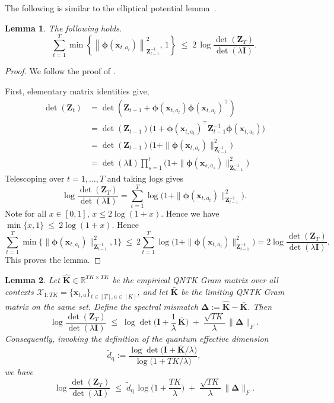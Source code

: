 \documentclass[pdflatex,sn-mathphys-num]{sn-jnl}%
\theoremstyle{thmstyleone}%
\theoremstyle{thmstyletwo}%
\theoremstyle{thmstylethree}%
\newtheorem{lemma}{Lemma}[section]
\newcommand{\norm}[1]{\left\lVert#1\right\rVert}
\newcommand{\xbf}{\mathbf{x}}
\newcommand{\Ibf}{\mathbf{I}}
\newcommand{\phibf}{\bm{\phi}}
\newcommand{\Zbf}{\mathbf{Z}}
\begin{document}
\begin{appendices}
The following is similar to  the elliptical potential lemma~\cite{linucb2011}.
\begin{lemma}
\label{lem:elliptical}
The following holds. 
\[
\sum_{t=1}^T \min\!\left\{ \norm{\phibf(\xbf_{t,a_t})}_{\Zbf_{t-1}^{-1}}^2,\,1 \right\}
\;\le\; 2\,\log\frac{\det(\Zbf_T)}{\det(\lambda \Ibf)}.
\]
\end{lemma}

\begin{proof}
We follow the proof of   \cite[Lemma 11]{linucb2011}.

First, elementary matrix identities give,
\begin{align*}
    \det(\Zbf_t) &=\det(\Zbf_{t-1}+\phibf(\xbf_{t,a_t})\phibf(\xbf_{t,a_t})^\top) \\
&=\det(\Zbf_{t-1}) \bigl(1+\phibf(\xbf_{t,a_t})^\top \Zbf_{t-1}^{-1}\phibf(\xbf_{t,a_t}) \bigr)\\
&=\det(\Zbf_{t-1}) \bigl(1+\|\phibf(\xbf_{t,a_t})\|_{\Zbf_{t-1}^{-1}}^2\bigr) \\
&= \det(\lambda \Ibf) \prod^t_{s=1} \bigl(1+\|\phibf(\xbf_{s,a_s})\|_{\Zbf_{s-1}^{-1}}^2\bigr)
\end{align*}
Telescoping over $t=1,\dots,T$ and taking logs gives
\begin{equation}\label{eq:logdet-sum}
\log\frac{\det(\Zbf_T)}{\det(\lambda \Ibf)}
=\sum_{t=1}^T \log\bigl(1+\|\phibf(\xbf_{t,a_t})\|_{\Zbf_{t-1}^{-1}}^2\bigr).
\end{equation}
Note for all $x \in [0,1]$, $x\leq 2\log(1+x)$. Hence we have $\min\{x,1\}\ \le\ 2\log(1+x)$.
Hence 
\[
\sum_{t=1}^T \min\bigl\{\|\phibf(\xbf_{t,a_t})\|_{\Zbf_{t-1}^{-1}}^2,1\bigr\}
\ \le\ 2\sum_{t=1}^T \log\bigl(1+\|\phibf(\xbf_{t,a_t})\|_{\Zbf_{t-1}^{-1}}^2\bigr)
=
2\log\frac{\det(\Zbf_T)}{\det(\lambda \Ibf)}.
\]
This proves the lemma.
\end{proof}






\begin{lemma}\label{lem:logdet-qntk}
Let $\hat{\mathbf K}\in\mathbb{R}^{TK\times TK}$ be the empirical QNTK Gram matrix over all contexts
$\mathcal{X}_{1:TK}=\{\xbf_{t,a}\}_{t\in[T],a\in[K]}$, and let $\bar{\mathbf K}$ be the limiting QNTK Gram matrix  on the same set.
Define the spectral mismatch
$\bm{\Delta} := 
\hat{\mathbf K}-\bar{\mathbf K}
$.
Then
\begin{equation}\label{eq:logdet-main}
\log\frac{\det(\Zbf_T)}{\det(\lambda \Ibf)}
\;\le\; \log\det\Big(\Ibf+\frac{1}{\lambda}\,\bar{\mathbf K}\Big)
\;+\; \frac{\sqrt{TK}}{\lambda}\,\|\bm{\Delta}\|_F.
\end{equation}
Consequently, invoking the definition of the quantum effective dimension
\[
\widetilde{d}_{\mathrm{q}}:= \frac{\log\det\!\big(\Ibf+\bar{\mathbf K}/\lambda\big)}{\log\!\big(1+TK/\lambda\big)},
\]
we have %
\[
\log\frac{\det(\Zbf_T)}{\det(\lambda \Ibf)}
\;\le\; \widetilde{d}_{\mathrm{q}}\,\log\!\bigg(1+\frac{TK}{\lambda}\bigg)
\;+\; \frac{\sqrt{TK}}{\lambda}\,\|\bm{\Delta}\|_F.
\]
\end{lemma}


\end{appendices}
\end{document}
